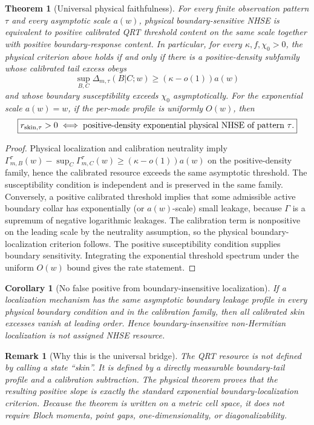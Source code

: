\documentclass[11pt]{article}
\newtheorem{theorem}{Theorem}
\newtheorem{corollary}{Corollary}
\newtheorem{remark}{Remark}
\begin{document}
\begin{theorem}[Universal physical faithfulness]
For every finite observation pattern $\tau$ and every asymptotic scale $a(w)$, physical
boundary-sensitive NHSE is equivalent to positive calibrated QRT threshold content on the same
scale together with positive boundary-response content. In particular, for every
$\kappa,f,\chi_0>0$, the physical criterion above holds if and only if there is a positive-density
subfamily whose calibrated tail excess obeys
\[
\sup_{B,C}\Delta_{m,\tau}(B|C;w)\ge(\kappa-o(1))a(w)
\]
and whose boundary susceptibility exceeds $\chi_0$ asymptotically.
For the exponential scale $a(w)=w$, if the per-mode profile is uniformly $O(w)$, then
\[
\boxed{r_{\rm skin,\tau}>0\iff
\text{positive-density exponential physical NHSE of pattern $\tau$}.}
\]
\end{theorem}

\begin{proof}
Physical localization and calibration neutrality imply
$\Gamma_{m,B}^{\tau}(w)-\sup_C\Gamma_{m,C}^{\tau}(w)
\ge(\kappa-o(1))a(w)$ on the positive-density family, hence the calibrated resource exceeds the
same asymptotic threshold. The susceptibility condition is independent and is preserved in the
same family. Conversely, a positive calibrated threshold implies that some admissible active
boundary collar has exponentially (or $a(w)$-scale) small leakage, because $\Gamma$ is a supremum
of negative logarithmic leakages. The calibration term is nonpositive on the leading scale by the
neutrality assumption, so the physical boundary-localization criterion follows. The positive
susceptibility condition supplies boundary sensitivity. Integrating the exponential threshold
spectrum under the uniform $O(w)$ bound gives the rate statement.
\end{proof}

\begin{corollary}[No false positive from boundary-insensitive localization]
If a localization mechanism has the same asymptotic boundary leakage profile in every physical
boundary condition and in the calibration family, then all calibrated skin excesses vanish at
leading order. Hence boundary-insensitive non-Hermitian localization is not assigned NHSE resource.
\end{corollary}

\begin{remark}[Why this is the universal bridge]
The QRT resource is not defined by calling a state ``skin''. It is defined by a directly
measurable boundary-tail profile and a calibration subtraction. The physical theorem proves
that the resulting positive slope is exactly the standard exponential boundary-localization
criterion. Because the theorem is written on a metric cell space, it does not require Bloch
momenta, point gaps, one-dimensionality, or diagonalizability.
\end{remark}
\end{document}
